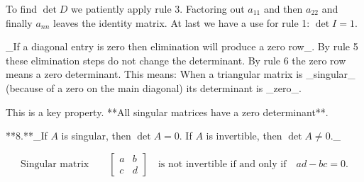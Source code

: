 To find \(\det D\) we patiently apply rule 3. Factoring out \(a_{11}\) and then \(a_{22}\) and finally \(a_{nn}\) leaves the identity matrix. At last we have a use for rule 1: \(\det I=1\). 

_If a diagonal entry is zero then elimination will produce a zero row_. By rule 5 these elimination steps do not change the determinant. By rule 6 the zero row means a zero determinant. This means: When a triangular matrix is _singular_ (because of a zero on the main diagonal) its determinant is _zero_.

This is a key property. **All singular matrices have a zero determinant**.

**8.**_If \(A\) is singular, then \(\det A=0\). If \(A\) is invertible, then \(\det A\neq 0\)._

\[\text{{Singular matrix}}\qquad\left[\begin{matrix}a&b\\ c&d\end{matrix}\right]\quad\text{is not invertible if and only if}\quad ad-bc=0.\]